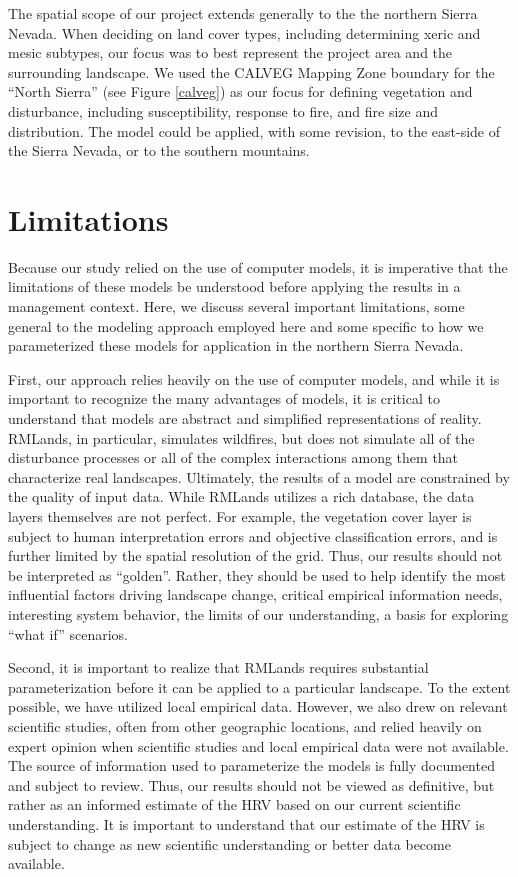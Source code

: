 The spatial scope of our project extends generally to the the northern Sierra Nevada. When deciding on land cover types, including determining xeric and mesic subtypes, our focus was to best represent the project area and the surrounding landscape. We used the CALVEG Mapping Zone boundary for the ``North Sierra'' (see Figure \ref{calveg}) as our focus for defining vegetation and disturbance, including susceptibility, response to fire, and fire size and distribution. The model could be applied, with some revision, to the east-side of the Sierra Nevada, or to the southern mountains.

\section{Limitations}

Because our study relied on the use of computer models, it is imperative that the limitations of these models be understood before applying the results in a management context. Here, we discuss several important limitations, some general to the modeling approach employed here and some specific to how we parameterized these models for application in the northern Sierra Nevada.

First, our approach relies heavily on the use of computer models, and while it is important to recognize the many advantages of models, it is critical to understand that models are abstract and simplified representations of reality. RMLands, in particular, simulates wildfires, but does not simulate all of the disturbance processes or all of the complex interactions among them that characterize real landscapes. Ultimately, the results of a model are constrained by the quality of input data. While RMLands utilizes a rich database, the data layers themselves are not perfect. For example, the vegetation cover layer is subject to human interpretation errors and objective classification errors, and is further limited by the spatial resolution of the grid. Thus, our results should not be interpreted as ``golden''. Rather, they should be used to help identify the most influential factors driving landscape change, critical empirical information needs, interesting system behavior, the limits of our understanding, a basis for exploring “what if” scenarios.

Second, it is important to realize that RMLands requires substantial parameterization before it can be applied to a particular landscape. To the extent possible, we have utilized local empirical data. However, we also drew on relevant scientific studies, often from other geographic locations, and relied heavily on expert opinion when scientific studies and local empirical data were not available. The source of information used to parameterize the models is fully documented and subject to review. Thus, our results should not be viewed as definitive, but rather as an informed estimate of the HRV based on our current scientific understanding. It is important to understand that our estimate of the HRV is subject to change as new scientific understanding or better data become available.

